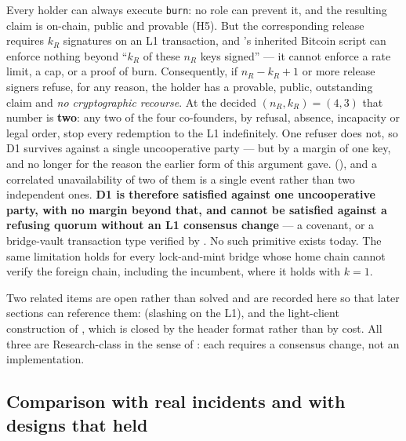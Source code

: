 \begin{openproblem}
\label{op:liveness}
Every holder can always execute \texttt{burn}: no role can prevent it, and the resulting claim is
on-chain, public and provable (H5). But the corresponding release requires $k_R$ signatures on an L1
transaction, and \Flux's inherited Bitcoin script can enforce nothing beyond ``$k_R$ of these $n_R$
keys signed'' --- it cannot enforce a rate limit, a cap, or a proof of burn. Consequently, if
$n_R - k_R + 1$ or more release signers refuse, for any reason, the holder has a provable, public,
outstanding claim and \emph{no cryptographic recourse}. At the decided $(n_R, k_R) = (4,3)$ that
number is \textbf{two}: any two of the four co-founders, by refusal, absence, incapacity or legal
order, stop every redemption to the L1 indefinitely. One refuser does not, so D1 survives against a
single uncooperative party --- but by a margin of one key, and no longer for the reason the earlier
form of this argument gave. 
(), and a correlated unavailability of two of them is a single event rather than two
independent ones. \textbf{D1 is therefore satisfied against one uncooperative party, with no margin
beyond that, and cannot be satisfied against a refusing quorum without an L1
consensus change} --- a covenant, or a bridge-vault transaction type verified by \fluxd. No such
primitive exists today. The same limitation holds for every lock-and-mint bridge whose home chain
cannot verify the foreign chain, including the incumbent, where it holds with $k = 1$.
\end{openproblem}

\noindent Two related items are open rather than solved and are recorded here so that later sections
can reference them:  (slashing on the L1), and the light-client construction of
, which is closed by the header format rather than by cost. All
three are Research-class in the sense of : each requires a consensus
change, not an implementation.

\subsection{Comparison with real incidents and with designs that held}
\label{sec:bridging-incidents}

